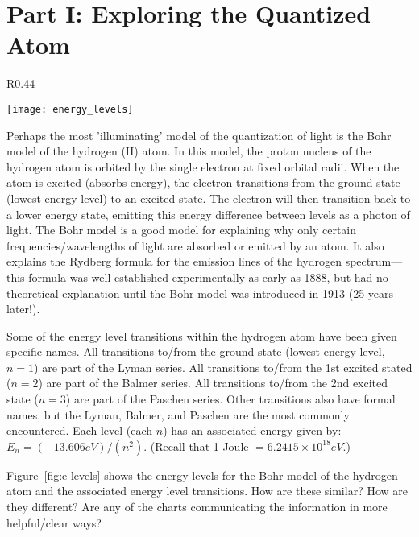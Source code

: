 \section*{Part I: Exploring the Quantized Atom}
%
\begin{wrapfigure}{R}{0.44\textwidth}
  \vspace{-15pt}  
  \begin{center}
    \texttt{[image: energy\_levels]}
  \end{center}
  \vspace{-20pt}
  \caption{Energy level transitions for the Bohr Model of the hydrogen atom.}
  \label{fig:e-levels}
  \vspace{-20pt}
\end{wrapfigure}
%
Perhaps the most 'illuminating' model of the quantization of light is the Bohr model of the hydrogen (H) atom. 
In this model, the proton nucleus of the hydrogen atom is orbited by the single electron at fixed orbital radii. 
When the atom is excited (absorbs energy), the electron transitions from the ground state (lowest energy level) to an excited state. 
The electron will then transition back to a lower energy state, emitting this energy difference between levels as a photon of light. 
The Bohr model is a good model for explaining why only certain frequencies/wavelengths of light are absorbed or emitted by an atom. 
It also explains the Rydberg formula for the emission lines of the hydrogen spectrum—this formula was well-established experimentally as early as 1888, but had no theoretical explanation until the Bohr model was introduced in 1913 (25 years later!). 
\par 
Some of the energy level transitions within the hydrogen atom have been given specific names. 
All transitions to/from the ground state (lowest energy level, $n = 1$) are part of the Lyman series. 
All transitions to/from the 1st excited stated ($n = 2$) are part of the Balmer series. 
All transitions to/from the 2nd excited state ($n = 3$) are part of the Paschen series. 
Other transitions also have formal names, but the Lyman, Balmer, and Paschen are the most commonly encountered. 
Each level (each $n$) has an associated energy given by: $E_{n}=(-13.606 eV)/(n^{2})$. 
(Recall that 1 Joule $= 6.2415 \times 10^{18} eV$.) 
\par 
Figure~\ref{fig:e-levels} shows the energy levels for the Bohr model of the hydrogen atom and the associated energy level transitions. 
How are these similar? 
How are they different? 
Are any of the charts communicating the information in more helpful/clear ways? 
